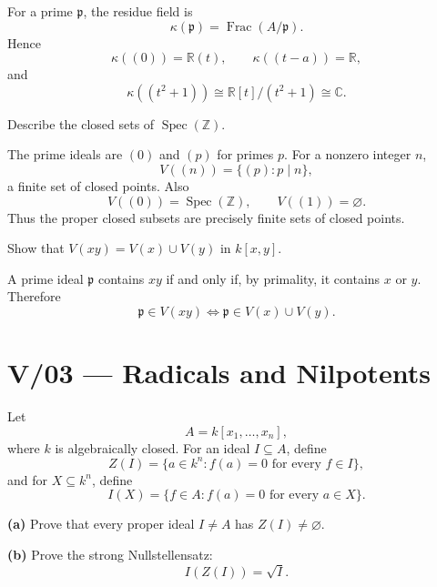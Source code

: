 \begin{solution}
For a prime \(\mathfrak p\), the residue field is
\[
\kappa(\mathfrak p)=\operatorname{Frac}(A/\mathfrak p).
\]
Hence
\[
\kappa((0))=\mathbb R(t),\qquad
\kappa((t-a))=\mathbb R,
\]
and
\[
\kappa((t^2+1))\cong \mathbb R[t]/(t^2+1)\cong\mathbb C.
\]
\end{solution}


\begin{problem}[CP-V-0093]
\label{prob:cp-v-0093}
Describe the closed sets of \(\operatorname{Spec}(\mathbb Z)\).
\end{problem}

\begin{solution}
The prime ideals are \((0)\) and \((p)\) for primes \(p\). For a nonzero integer \(n\),
\[
V((n))=\{(p):p\mid n\},
\]
a finite set of closed points. Also
\[
V((0))=\operatorname{Spec}(\mathbb Z),\qquad V((1))=\varnothing.
\]
Thus the proper closed subsets are precisely finite sets of closed points.
\end{solution}


\begin{problem}[CP-V-0094]
\label{prob:cp-v-0094}
Show that \(V(xy)=V(x)\cup V(y)\) in \(k[x,y]\).
\end{problem}

\begin{solution}
A prime ideal \(\mathfrak p\) contains \(xy\) if and only if, by primality, it contains \(x\) or \(y\). Therefore
\[
\mathfrak p\in V(xy)
\iff
\mathfrak p\in V(x)\cup V(y).
\]
\end{solution}



\section*{V/03 --- Radicals and Nilpotents}

\begin{problem}[CP-V-0004]
\label{prob:cp-v-0004}
Let
\[
A=k[x_1,\dots,x_n],
\]
where \(k\) is algebraically closed. For an ideal \(I\subseteq A\), define
\[
Z(I)=\{a\in k^n:f(a)=0\text{ for every }f\in I\},
\]
and for \(X\subseteq k^n\), define
\[
I(X)=\{f\in A:f(a)=0\text{ for every }a\in X\}.
\]

\textbf{(a)} Prove that every proper ideal \(I\ne A\) has \(Z(I)\ne\varnothing\).

\textbf{(b)} Prove the strong Nullstellensatz:
\[
I(Z(I))=\sqrt I.
\]
\end{problem}

